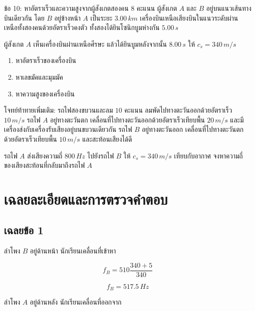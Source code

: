 \begin{exercisebox}{ข้อ 10: หาอัตราเร็วและความสูงจากผู้สังเกตสองคน $8$ คะแนน}
ผู้สังเกต $A$ และ $B$ อยู่บนแนวเส้นทางบินเดียวกัน โดย $B$ อยู่ข้างหน้า $A$ เป็นระยะ $3.00\,\si{km}$ เครื่องบินเหนือเสียงบินในแนวระดับผ่านเหนือทั้งสองคนด้วยอัตราเร็วคงตัว ทั้งสองได้ยินโซนิกบูมห่างกัน $5.00\,\si{s}$

ผู้สังเกต $A$ เห็นเครื่องบินผ่านเหนือศีรษะ แล้วได้ยินบูมหลังจากนั้น $8.00\,\si{s}$ ให้ $c_s=340\,\si{m/s}$

\begin{enumerate}[label=(\alph*)]
    \item หาอัตราเร็วของเครื่องบิน
    \item หาเลขมัคและมุมมัค
    \item หาความสูงของเครื่องบิน
\end{enumerate}
\end{exercisebox}

\begin{exercisebox}{โจทย์ท้าทายเพิ่มเติม: รถไฟสองขบวนและลม $10$ คะแนน}
ลมพัดไปทางตะวันออกด้วยอัตราเร็ว $10\,\si{m/s}$ รถไฟ $A$ อยู่ทางตะวันตก เคลื่อนที่ไปทางตะวันออกด้วยอัตราเร็วเทียบพื้น $20\,\si{m/s}$ และมีเครื่องส่งกับเครื่องรับเสียงอยู่บนขบวนเดียวกัน รถไฟ $B$ อยู่ทางตะวันออก เคลื่อนที่ไปทางตะวันตกด้วยอัตราเร็วเทียบพื้น $10\,\si{m/s}$ และสะท้อนเสียงได้ดี

รถไฟ $A$ ส่งเสียงความถี่ $800\,\si{Hz}$ ไปยังรถไฟ $B$ ให้ $c_s=340\,\si{m/s}$ เทียบกับอากาศ จงหาความถี่ของเสียงสะท้อนที่กลับมาถึงรถไฟ $A$
\end{exercisebox}

\section{เฉลยละเอียดและการตรวจคำตอบ}

\subsection*{เฉลยข้อ 1}

ลำโพง $B$ อยู่ด้านหน้า นักเรียนเคลื่อนที่เข้าหา

\[
f_B=510\frac{340+5}{340}
\]

\[
\boxed{f_B=517.5\,\si{Hz}}
\]

ลำโพง $A$ อยู่ด้านหลัง นักเรียนเคลื่อนที่ออกจาก

